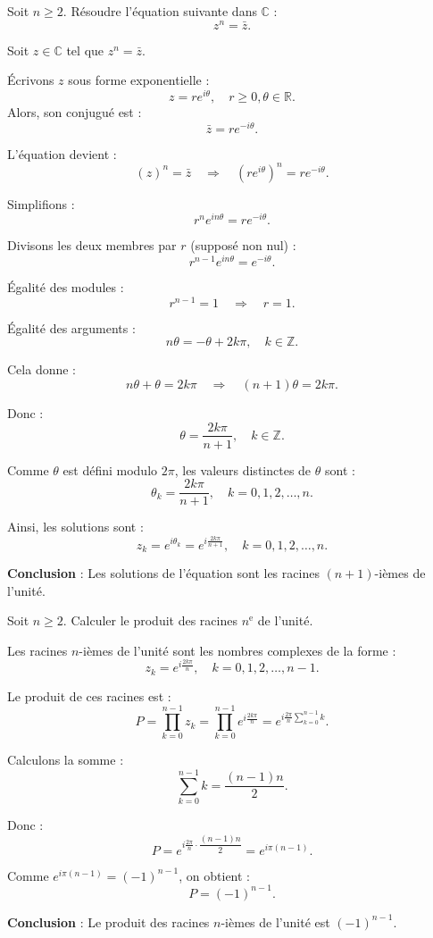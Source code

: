 \documentclass[a4paper,12pt]{article}
\author{}
\date{}
\begin{document}
\begin{tcolorbox}[title=Exercice 10 - {[}Calculer{]}]
Soit \( n \geq 2 \). Résoudre l’équation suivante dans \( \mathbb{C} \) :
\[
z^n = \bar{z}.
\]
\end{tcolorbox}

\begin{solutionbox}
Soit \( z \in \mathbb{C} \) tel que \( z^n = \bar{z} \).

Écrivons \( z \) sous forme exponentielle :
\[
z = r e^{i\theta}, \quad r \geq 0, \theta \in \mathbb{R}.
\]
Alors, son conjugué est :
\[
\bar{z} = r e^{-i\theta}.
\]

L'équation devient :
\[
(z)^n = \bar{z} \quad \Rightarrow \quad (r e^{i\theta})^n = r e^{-i\theta}.
\]

Simplifions :
\[
r^n e^{in\theta} = r e^{-i\theta}.
\]

Divisons les deux membres par \( r \) (supposé non nul) :
\[
r^{n-1} e^{in\theta} = e^{-i\theta}.
\]

Égalité des modules :
\[
r^{n-1} = 1 \quad \Rightarrow \quad r = 1.
\]

Égalité des arguments :
\[
n\theta = -\theta + 2k\pi, \quad k \in \mathbb{Z}.
\]

Cela donne :
\[
n\theta + \theta = 2k\pi \quad \Rightarrow \quad (n + 1)\theta = 2k\pi.
\]

Donc :
\[
\theta = \dfrac{2k\pi}{n+1}, \quad k \in \mathbb{Z}.
\]

Comme \( \theta \) est défini modulo \( 2\pi \), les valeurs distinctes de \( \theta \) sont :
\[
\theta_k = \dfrac{2k\pi}{n+1}, \quad k = 0, 1, 2, \dots, n.
\]

Ainsi, les solutions sont :
\[
z_k = e^{i\theta_k} = e^{i\frac{2k\pi}{n+1}}, \quad k = 0, 1, 2, \dots, n.
\]

\textbf{Conclusion} : Les solutions de l'équation sont les racines \((n+1)\)-ièmes de l'unité.
\end{solutionbox}

\begin{tcolorbox}[title=Exercice 11 - {[}Calculer{]}]
Soit \( n \geq 2 \). Calculer le produit des racines \( n^{\text{e}} \) de l’unité.
\end{tcolorbox}

\begin{solutionbox}
Les racines \( n \)-ièmes de l'unité sont les nombres complexes de la forme :
\[
z_k = e^{i\frac{2k\pi}{n}}, \quad k = 0, 1, 2, \dots, n-1.
\]

Le produit de ces racines est :
\[
P = \prod_{k=0}^{n-1} z_k = \prod_{k=0}^{n-1} e^{i\frac{2k\pi}{n}} = e^{i\frac{2\pi}{n} \sum_{k=0}^{n-1} k}.
\]

Calculons la somme :
\[
\sum_{k=0}^{n-1} k = \dfrac{(n-1)n}{2}.
\]

Donc :
\[
P = e^{i\frac{2\pi}{n} \cdot \dfrac{(n-1)n}{2}} = e^{i\pi(n-1)}.
\]

Comme \( e^{i\pi(n-1)} = (-1)^{n-1} \), on obtient :
\[
P = (-1)^{n-1}.
\]

\textbf{Conclusion} : Le produit des racines \( n \)-ièmes de l'unité est \( (-1)^{n-1} \).
\end{solutionbox}
\end{document}
